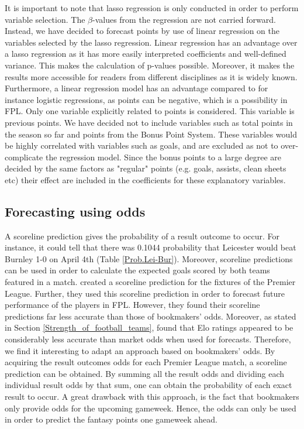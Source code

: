 It is important to note that lasso regression is only conducted in order to perform variable selection. The $\beta$-values from the regression are not carried forward. Instead, we have decided to forecast points by use of linear regression on the variables selected by the lasso regression. Linear regression has an advantage over a lasso regression as it has more easily interpreted coefficients and well-defined variance. This makes the calculation of p-values possible. Moreover, it makes the results more accessible for readers from different disciplines as it is widely known. Furthermore, a linear regression model has an advantage compared to for instance logistic regressions, as points can be negative, which is a possibility in FPL.
\newpar 
Only one variable explicitly related to points is considered. This variable is previous points. We have decided not to include variables such as total points in the season so far and points from the Bonus Point System. These variables would be highly correlated with variables such as goals, and are excluded as not to over-complicate the regression model. Since the bonus points to a large degree are decided by the same factors as "regular" points (e.g. goals, assists, clean sheets etc) their effect are included in the coefficients for these explanatory variables. 


\subsection{Forecasting using odds}
A scoreline prediction gives the probability of a result outcome to occur. For instance, it could tell that there was 0.1044 probability that Leicester would beat Burnley 1-0 on April 4th (Table \ref{Prob.Lei-Bur}). Moreover, scoreline predictions can be used in order to calculate the expected goals scored by both teams featured in a match. \cite{Gupta} created a scoreline prediction for the fixtures of the Premier League. Further, they used this scoreline prediction in order to forecast future performance of the players in FPL. However, they found their scoreline predictions far less accurate than those of bookmakers' odds. Moreover, as stated in Section \ref{Strength_of_football_teams}, \cite{Hvattum} found that Elo ratings appeared to be considerably less accurate than market odds when used for forecasts. Therefore, we find it interesting to adapt an approach based on bookmakers' odds. By acquiring the result outcomes odds for each Premier League match, a scoreline prediction can be obtained. By summing all the result odds and dividing each individual result odds by that sum, one can obtain the probability of each exact result to occur. A great drawback with this approach, is the fact that bookmakers only provide odds for the upcoming gameweek. Hence, the odds can only be used in order to predict the fantasy points one gameweek ahead.  

